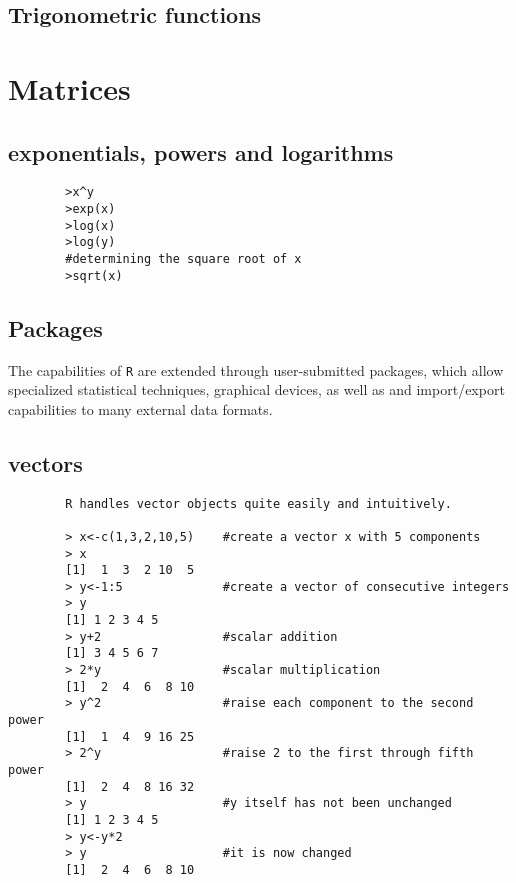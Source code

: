 \documentclass[a4paper,12pt]{article}
\begin{document}
	\subsection{Trigonometric functions}
	\section{Matrices}
	
	
	\newpage
	\subsection{exponentials, powers and logarithms}
	\large
	\begin{framed}
		\begin{verbatim}
		>x^y
		>exp(x)
		>log(x)
		>log(y)
		#determining the square root of x
		>sqrt(x)
		\end{verbatim}
	\end{framed}
	
	
	\subsection{Packages}
	The capabilities of \texttt{R} are extended through user-submitted packages, which allow specialized statistical techniques, graphical devices, as well as and
	import/export capabilities to many external data formats.
	
	
	
	\large
	\subsection{vectors}
	\large
	\begin{framed}
		\begin{verbatim}
		R handles vector objects quite easily and intuitively.
		
		> x<-c(1,3,2,10,5)    #create a vector x with 5 components
		> x
		[1]  1  3  2 10  5
		> y<-1:5              #create a vector of consecutive integers
		> y
		[1] 1 2 3 4 5
		> y+2                 #scalar addition
		[1] 3 4 5 6 7
		> 2*y                 #scalar multiplication
		[1]  2  4  6  8 10
		> y^2                 #raise each component to the second power
		[1]  1  4  9 16 25
		> 2^y                 #raise 2 to the first through fifth power
		[1]  2  4  8 16 32
		> y                   #y itself has not been unchanged
		[1] 1 2 3 4 5
		> y<-y*2
		> y                   #it is now changed
		[1]  2  4  6  8 10
		\end{verbatim}
	\end{framed}
	\large
	
\end{document}
